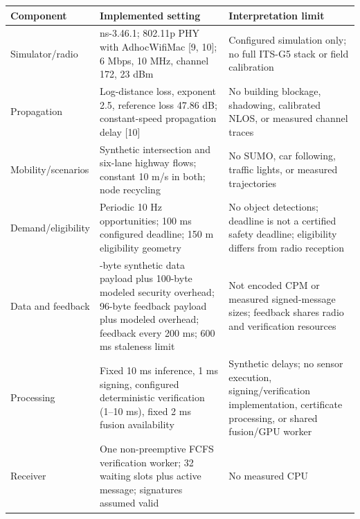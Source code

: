 \documentclass[
]{article}
\newcounter{none} %
\begin{document}
{\def\LTcaptype{none} %
\begin{longtable}[]{@{}
  >{\raggedright\arraybackslash}p{}
  >{\raggedright\arraybackslash}p{}
  >{\raggedright\arraybackslash}p{}@{}}
\toprule\noalign{}
\begin{minipage}[b]{\linewidth}\raggedright
Component
\end{minipage} & \begin{minipage}[b]{\linewidth}\raggedright
Implemented setting
\end{minipage} & \begin{minipage}[b]{\linewidth}\raggedright
Interpretation limit
\end{minipage} \\
\midrule\noalign{}
\endhead
\bottomrule\noalign{}
\endlastfoot
Simulator/radio & ns-3.46.1; 802.11p PHY with AdhocWifiMac {[}9, 10{]};
6 Mbps, 10 MHz, channel 172, 23 dBm & Configured simulation only; no
full ITS-G5 stack or field calibration \\
Propagation & Log-distance loss, exponent 2.5, reference loss 47.86 dB;
constant-speed propagation delay {[}10{]} & No building blockage,
shadowing, calibrated NLOS, or measured channel traces \\
Mobility/scenarios & Synthetic intersection and six-lane highway flows;
constant 10 m/s in both; node recycling & No SUMO, car following,
traffic lights, or measured trajectories \\
Demand/eligibility & Periodic 10 Hz opportunities; 100 ms configured
deadline; 150 m eligibility geometry & No object detections; deadline is
not a certified safety deadline; eligibility differs from radio
reception \\
Data and feedback & 1100-byte synthetic data payload plus 100-byte
modeled security overhead; 96-byte feedback payload plus modeled
overhead; feedback every 200 ms; 600 ms staleness limit & Not encoded
CPM or measured signed-message sizes; feedback shares radio and
verification resources \\
Processing & Fixed 10 ms inference, 1 ms signing, configured
deterministic verification (1--10 ms), fixed 2 ms fusion availability &
Synthetic delays; no sensor execution, signing/verification
implementation, certificate processing, or shared fusion/GPU worker \\
Receiver & One non-preemptive FCFS verification worker; 32 waiting slots
plus active message; signatures assumed valid & No measured CPU

\end{longtable}}
\end{document}

